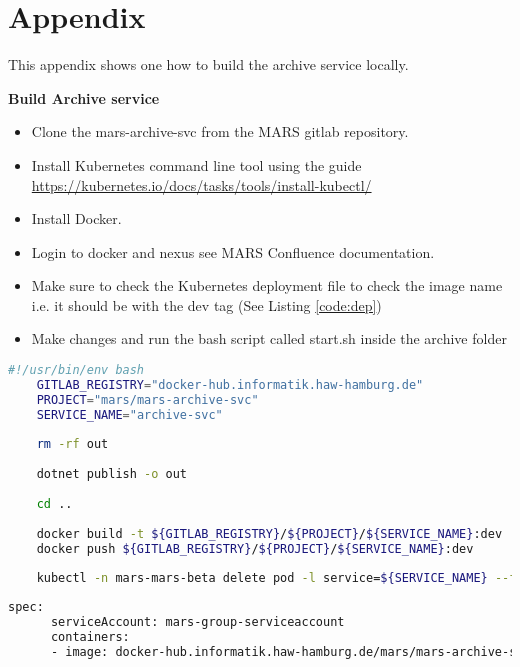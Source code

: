 \chapter{Appendix}
This appendix shows one how to build the archive service locally. 

\textbf{Build Archive service}
\begin{itemize}
    \item Clone the mars-archive-svc from the MARS gitlab repository.
    \item Install Kubernetes command line tool using the guide \url{https://kubernetes.io/docs/tasks/tools/install-kubectl/} 
    \item Install Docker.
    \item Login to docker and nexus see MARS Confluence documentation.
    \item Make sure to check the Kubernetes deployment file to check the image name i.e. it should be with the dev tag (See Listing \ref{code:dep})
    \item Make changes and run the bash script called start.sh inside the archive folder
\end{itemize}

\begin{lstlisting}[language=bash,caption={Archive service local build script}, captionpos=b]
    #!/usr/bin/env bash
    GITLAB_REGISTRY="docker-hub.informatik.haw-hamburg.de"
    PROJECT="mars/mars-archive-svc"
    SERVICE_NAME="archive-svc"
    
    rm -rf out
    
    dotnet publish -o out
    
    cd ..
    
    docker build -t ${GITLAB_REGISTRY}/${PROJECT}/${SERVICE_NAME}:dev .
    docker push ${GITLAB_REGISTRY}/${PROJECT}/${SERVICE_NAME}:dev
    
    kubectl -n mars-mars-beta delete pod -l service=${SERVICE_NAME} --force
\end{lstlisting}

\begin{lstlisting}[language=bash,caption={Archive service deployment file snippet},label={code:dep}, captionpos=b]
spec:
      serviceAccount: mars-group-serviceaccount
      containers:
      - image: docker-hub.informatik.haw-hamburg.de/mars/mars-archive-svc/archive-svc:dev
\end{lstlisting}
